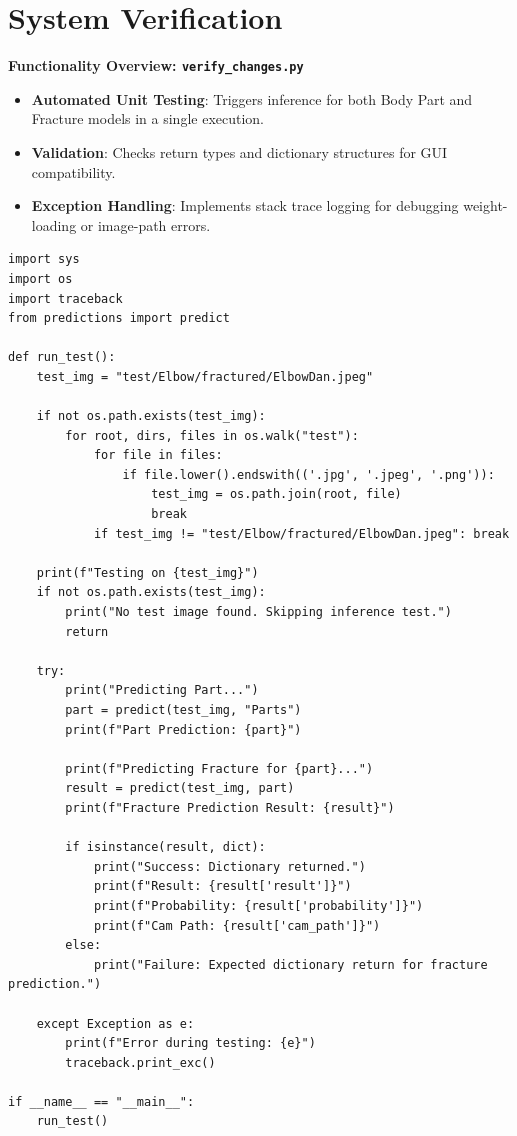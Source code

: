 \documentclass[a4paper,12pt]{report}
\begin{document}
    \section{System Verification}
    \textbf{Functionality Overview: \texttt{verify\_changes.py}}
    \begin{itemize}
        \item \textbf{Automated Unit Testing}: Triggers inference for both Body Part and Fracture models in a single execution.
        \item \textbf{Validation}: Checks return types and dictionary structures for GUI compatibility.
        \item \textbf{Exception Handling}: Implements stack trace logging for debugging weight-loading or image-path errors.
    \end{itemize}
    \begin{lstlisting}[style=pythonstyle]
import sys
import os
import traceback
from predictions import predict

def run_test():
    test_img = "test/Elbow/fractured/ElbowDan.jpeg"
    
    if not os.path.exists(test_img):
        for root, dirs, files in os.walk("test"):
            for file in files:
                if file.lower().endswith(('.jpg', '.jpeg', '.png')):
                    test_img = os.path.join(root, file)
                    break
            if test_img != "test/Elbow/fractured/ElbowDan.jpeg": break
            
    print(f"Testing on {test_img}")
    if not os.path.exists(test_img):
        print("No test image found. Skipping inference test.")
        return

    try:
        print("Predicting Part...")
        part = predict(test_img, "Parts")
        print(f"Part Prediction: {part}")
        
        print(f"Predicting Fracture for {part}...")
        result = predict(test_img, part)
        print(f"Fracture Prediction Result: {result}")
        
        if isinstance(result, dict):
            print("Success: Dictionary returned.")
            print(f"Result: {result['result']}")
            print(f"Probability: {result['probability']}")
            print(f"Cam Path: {result['cam_path']}")
        else:
            print("Failure: Expected dictionary return for fracture prediction.")
            
    except Exception as e:
        print(f"Error during testing: {e}")
        traceback.print_exc()

if __name__ == "__main__":
    run_test()
    \end{lstlisting}
    
\end{document}
